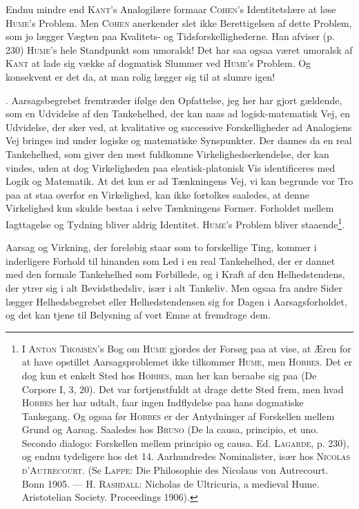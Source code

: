 \documentclass[12pt]{article}
\begin{document}
Endnu mindre end \textsc{Kant}'s Analogilære formaar \textsc{Cohen}'s
Identitetslære at løse \textsc{Hume}'s Problem. Men \textsc{Cohen} anerkender
slet ikke Berettigelsen af dette Problem, som jo lægger Vægten paa Kvalitets- og
Tidsforskellighederne. Han afviser (p. 230) \textsc{Hume}'s hele Standpunkt som
umoralsk! Det har saa ogsaa været umoralsk af \textsc{Kant} at lade sig vække af
dogmatisk Slummer ved \textsc{Hume}'s Problem. Og konsekvent er det da, at man
rolig lægger sig til at slumre igen!

. Aarsagsbegrebet fremtræder ifølge den Opfattelse, jeg her har gjort
gældende, som en Udvidelse af den Tankehelhed, der kan naas ad logisk-matematisk
Vej, en Udvidelse, der sker ved, at kvalitative og successive Forskelligheder ad
Analogiens Vej bringes ind under logiske og matematiske Synspunkter. Der dannes
da en real Tankehelhed, som giver den mest fuldkomne Virkelighedserkendelse, der
kan vindes, uden at dog Virkeligheden paa eleatisk-platonisk Vis identificeres
med Logik og Matematik. At det kun er ad Tænkningens Vej, vi kan begrunde vor
Tro paa at staa overfor en Virkelighed, kan ikke fortolkes saaledes, at denne
Virkelighed kun skulde bestaa i selve Tænkningens Former. Forholdet mellem
Iagttagelse og Tydning bliver aldrig Identitet. \textsc{Hume}'s Problem bliver
staaende\footnote{I \textsc{Anton Thomsen}'s Bog om \textsc{Hume} gjordes der
Forsøg paa at vise, at Æren for at have opstillet Aarsagsproblemet ikke
tilkommer \textsc{Hume}, men \textsc{Hobbes}. Det er dog kun et enkelt Sted hos
\textsc{Hobbes}, man her kan beraabe sig paa (De Corpore I, 3, 20). Det var
fortjenstfuldt at drage dette Sted frem, men hvad \textsc{Hobbes} her har
udtalt, faar ingen Indflydelse paa hans dogmatiske Tankegang. Og ogsaa før
\textsc{Hobbes} er der Antydninger af Forskellen mellem Grund og Aarsag.
Saaledes hos \textsc{Bruno} (De la causa, principio, et uno. Secondo dialogo:
Forskellen mellem principio og causa. Ed. \textsc{Lagarde}, p. 230), og endnu
tydeligere hos det 14. Aarhundredes Nominalister, især hos \textsc{Nicolas
d'Autrecourt}. (Se \textsc{Lappe}: Die Philosophie des Nicolaus von Autrecourt.
Bonn 1905. --- H. \textsc{Rashdall}: Nicholas de Ultricuria, a medieval Hume.
Aristotelian Society. Proceedings 1906).}.

Aarsag og Virkning, der foreløbig staar som to forskellige Ting, kommer i
inderligere Forhold til hinanden som Led i en real Tankehelhed, der er dannet
med den formale Tankehelhed som Forbillede, og i Kraft af den Helhedstendens,
der ytrer sig i alt Bevidsthedsliv, især i alt Tankeliv. Men ogsaa fra andre
Sider lægger Helhedsbegrebet eller Helhedstendensen sig for Dagen i
Aarsagsforholdet, og det kan tjene til Belysning af vort Emne at fremdrage dem.
\end{document}
